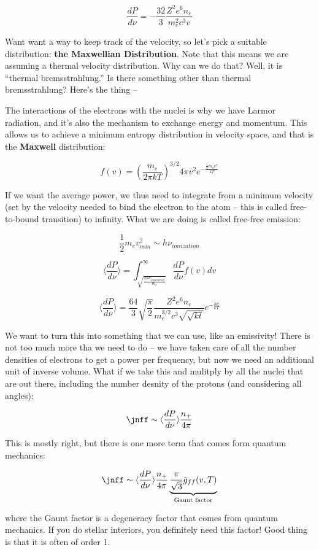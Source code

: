 \documentclass{article}
\begin{document}
$$
\frac{dP}{d\nu} = -\frac{32}{3}\frac{Z^2 e^6 n_e}{m_e^2 c^3 v}
$$

Want want a way to keep track of the velocity, so let's pick a suitable distribution: \textbf{the Maxwellian Distribution}. Note that this means we are assuming a thermal velocity distribution. Why can we do that? Well, it is ``thermal bremsstrahlung.'' Is there something other than thermal bremsstrahlung? Here's the thing --

The interactions of the electrons with the nuclei is why we have Larmor radiation, and it's also the mechanism to exchange energy and momentum. This allows us to achieve a minimum entropy distribution in velocity space, and that is the \textbf{Maxwell} distribution:

$$
f(v) = \left(\frac{m_e}{2\pi kT}\right)^{3/2} 4\pi v^2 e^{-\frac{\frac12 m_e v^2}{kT}}
$$

If we want the average power, we thus need to integrate from a minimum velocity (set by the velocity needed to bind the electron to the atom -- this is called free-to-bound transition) to infinity. What we are doing is called free-free emission: 

$$
\frac12 m_e v_{min}^2 \sim h \nu_{ionization}
$$

$$
\langle \frac{dP }{d\nu}\rangle = \int_{\sqrt{\frac{2h\nu_{ionization}}{m_e}}}^{\infty} \frac{dP}{d\nu} f(v) dv
$$

$$
\boxed{\langle \frac{dP }{d\nu}\rangle = \frac{64}{3} \sqrt{\frac{\pi}{2}} \frac{Z^2 e^6 n_e}{m_e^{3/2} c^3 \sqrt{\sqrt{kt}}}e^{-\frac{h\nu}{kT}}}
$$

We want to turn this into something that we can use, like an emissivity! There is not too much more tha we need to do -- we have taken care of all the number densities of electrons to get a power per frequency, but now we need an additional unit of inverse volume. What if we take this and mulitply by all the nuclei that are out there, including the number desnity of the protons (and considering all angles): 

$$
\jnff \sim \langle \frac{dP }{d\nu}\rangle \frac{n_{+}}{4\pi}
$$

This is mostly right, but there is one more term that comes form quantum mechanics:

$$
\jnff \sim \langle \frac{dP }{d\nu}\rangle \frac{n_{+}}{4\pi} \underbrace{\frac{\pi}{\sqrt{3}} \bar{g}_{ff}(v,T)}_\text{Gaunt factor}
$$

where the Gaunt factor is a degeneracy factor that comes from quantum mechanics. If you do stellar interiors, you definitely need this factor! Good thing is that it is often of order 1. 
\end{document}
